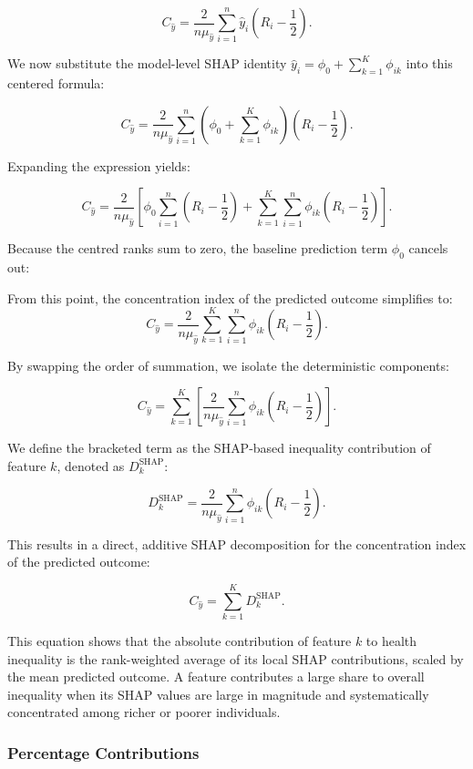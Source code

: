 \documentclass[
  11pt,
  a4paper,
]{article}
\begin{document}
\[
C_{\hat{y}} = \frac{2}{n\mu_{\hat{y}}}\sum_{i=1}^n \hat{y}_i \left(R_i - \frac{1}{2}\right).
\]

We now substitute the model-level SHAP identity
\(\hat{y}_i = \phi_0 + \sum_{k=1}^K \phi_{ik}\) into this centered
formula:

\[
C_{\hat{y}} = \frac{2}{n\mu_{\hat{y}}} \sum_{i=1}^n \left( \phi_0 + \sum_{k=1}^K \phi_{ik} \right) \left(R_i - \frac{1}{2}\right).
\]

Expanding the expression yields:

\[
C_{\hat{y}} = \frac{2}{n\mu_{\hat{y}}} \left[ \phi_0 \sum_{i=1}^n \left(R_i - \frac{1}{2}\right) + \sum_{k=1}^K \sum_{i=1}^n \phi_{ik}\left(R_i - \frac{1}{2}\right) \right].
\]

Because the centred ranks sum to zero, the baseline prediction term
\(\phi_0\) cancels out:

From this point, the concentration index of the predicted outcome
simplifies to: \[
C_{\hat{y}} = \frac{2}{n\mu_{\hat{y}}} \sum_{k=1}^K \sum_{i=1}^n \phi_{ik} \left(R_i - \frac{1}{2}\right).
\]

By swapping the order of summation, we isolate the deterministic
components:

\[
C_{\hat{y}} = \sum_{k=1}^K \left[ \frac{2}{n\mu_{\hat{y}}} \sum_{i=1}^n \phi_{ik} \left(R_i - \frac{1}{2}\right) \right].
\]

We define the bracketed term as the SHAP-based inequality contribution
of feature \(k\), denoted as \(D_k^{\text{SHAP}}\):

\[
D_k^{\text{SHAP}} = \frac{2}{n\mu_{\hat{y}}} \sum_{i=1}^n \phi_{ik} \left(R_i - \frac{1}{2}\right).
\]

This results in a direct, additive SHAP decomposition for the
concentration index of the predicted outcome:

\[
C_{\hat{y}} = \sum_{k=1}^K D_k^{\text{SHAP}}.
\]

This equation shows that the absolute contribution of feature \(k\) to
health inequality is the rank-weighted average of its local SHAP
contributions, scaled by the mean predicted outcome. A feature
contributes a large share to overall inequality when its SHAP values are
large in magnitude and systematically concentrated among richer or
poorer individuals.

\subsubsection{Percentage
Contributions}\label{sec-shap-percentage-contributions}
\end{document}
